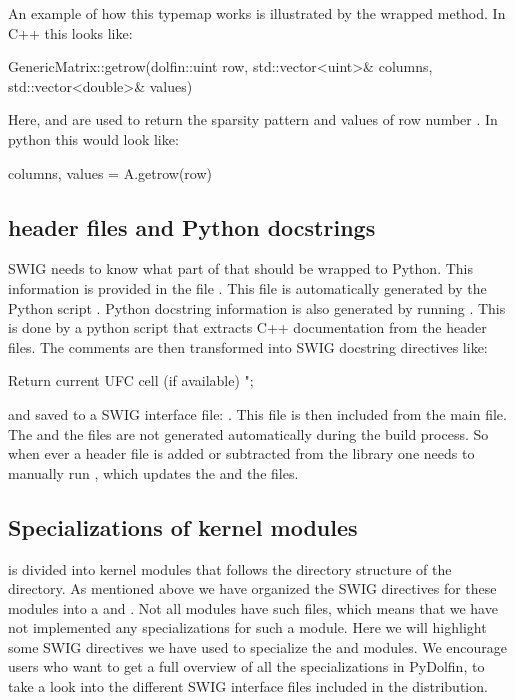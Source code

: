 An example of how this typemap works is illustrated by the wrapped  method. In C++ this looks like:
\begin{c++}
GenericMatrix::getrow(dolfin::uint row, std::vector<uint>& columns, std::vector<double>& values)
\end{c++}
Here,  and  are used to return the sparsity pattern and values of row number . In python this would look like:
\begin{python}
columns, values = A.getrow(row)
\end{python}

\subsection{\dolfin header files and Python docstrings}
SWIG needs to know what part of \dolfin that should be wrapped to Python. This information is provided in the file . This file is automatically generated by the Python script . Python docstring information is also generated by running . This is done by a python script that extracts C++ documentation from the header files. The comments are then transformed into SWIG docstring directives like:
\begin{c++}
Return current UFC cell (if available)
";
\end{c++}
and saved to a SWIG interface file: . This file is then included from the main  file. The  and the  files are not generated automatically during the build process. So when ever a header file is added or subtracted from the \dolfin library one needs to manually run , which updates the  and the  files.\par

\subsection{Specializations of kernel modules}
\dolfin is divided into kernel modules that follows the directory structure of the  directory. As mentioned above we have organized the SWIG directives for these modules into a  and . Not all modules have such files, which means that we have not implemented any specializations for such a module. Here we will highlight some SWIG directives we have used to specialize the  and  modules. We encourage users who want to get a full overview of all the specializations in PyDolfin, to take a look into the different SWIG interface files included in the distribution.\par

